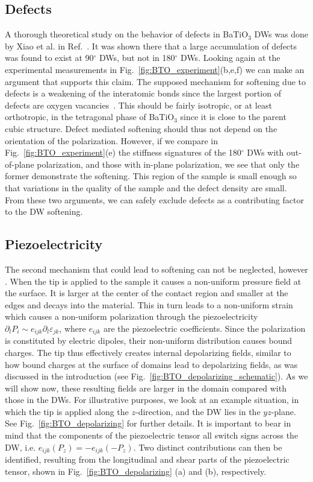 \subsection{Defects}
A thorough theoretical study on the behavior of defects in BaTiO$_3$ \glspl{DW} was done by Xiao et al. in Ref.~\cite{Xiao2005}.
It was shown there that a large accumulation of defects was found to exist at 90$^\circ$ \glspl{DW}, but not in 180$^\circ$ \glspl{DW}.
Looking again at the experimental measurements in Fig.~\ref{fig:BTO_experiment}(b,e,f) we can make an argument that supports this claim.
The supposed mechanism for softening due to defects is a weakening of the interatomic bonds since the largest portion of defects are oxygen vacancies~\cite{Tsuji2005}.
This should be fairly isotropic, or at least orthotropic, in the tetragonal phase of BaTiO$_3$ since it is close to the parent cubic structure.
Defect mediated softening should thus not depend on the orientation of the polarization.
However, if we compare in Fig.~\ref{fig:BTO_experiment}(e) the stiffness signatures of the 180$^\circ$ \glspl{DW} with out-of-plane polarization, and those with in-plane polarization, we see that only the former demonstrate the softening.
This region of the sample is small enough so that variations in the quality of the sample and the defect density are small.
From these two arguments, we can safely exclude defects as a contributing factor to the \gls{DW} softening.

\subsection{Piezoelectricity \label{sec:BTO_piezoelectricity}}
The second mechanism that could lead to softening can not be neglected, however \cite{Tsuji2005,Stefani2020}.
When the tip is applied to the sample it causes a non-uniform pressure field at the surface.
It is larger at the center of the contact region and smaller at the edges and decays into the material.
This in turn leads to a non-uniform strain which causes a non-uniform polarization through the piezoelectricity $\partial_l P_i \sim e_{ijk} \partial_l \varepsilon_{jk}$, where $e_{ijk}$ are the piezoelectric coefficients.
Since the polarization is constituted by electric dipoles, their non-uniform distribution causes bound charges.
The tip thus effectively creates internal depolarizing fields, similar to how bound charges at the surface of domains lead to depolarizing fields, as was discussed in the introduction (see Fig.~\ref{fig:BTO_depolarizing_schematic}). 
As we will show now, these resulting fields are larger in the domain compared with those in the \glspl{DW}.
For illustrative purposes, we look at an example situation, in which the tip is applied along the $z$-direction, and the \gls{DW} lies in the $yz$-plane. See Fig.~\ref{fig:BTO_depolarizing} for further details.
It is important to bear in mind that the components of the piezoelectric tensor all switch signs across the \gls{DW}, i.e. $e_{ijk}(P_z) = - e_{ijk}(-P_z)$. 
Two distinct contributions can then be identified, resulting from the longitudinal and shear parts of the piezoelectric tensor, shown in Fig.~\ref{fig:BTO_depolarizing} (a) and (b), respectively.

